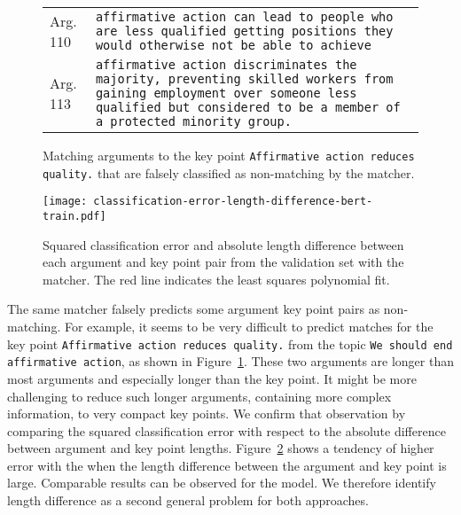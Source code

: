 \begin{figure}
    \begin{tabularx}{\linewidth}{@{}p{2em}X@{}}
        Arg. 110 & \texttt{affirmative action can lead to people who are less qualified getting positions they would otherwise not be able to achieve} \\
        Arg. 113 & \texttt{affirmative action discriminates the majority, preventing skilled workers from gaining employment over someone less qualified but considered to be a member of a protected minority group.}
    \end{tabularx}
    \caption{Matching arguments to the key point \texttt{Affirmative action reduces quality.} that are falsely classified as non-matching by the \BertBase matcher.}
    \label{example-5-110-113}
\end{figure}
\begin{figure}
    \texttt{[image: classification-error-length-difference-bert-train.pdf]}
    \caption{Squared classification error and absolute length difference between each argument and key point pair from the validation set with the \BertBase matcher. The red line indicates the least squares polynomial fit.}
    \label{classification-error-length}
\end{figure}
The same \BertBase matcher falsely predicts some argument key point pairs as non-matching.
For example, it seems to be very difficult to predict matches for the key point \texttt{Affirmative action reduces quality.} from the topic \texttt{We should end affirmative action}, as shown in Figure~\ref{example-5-110-113}. These two arguments are longer than most arguments %
and especially longer than the key point.
It might be more challenging to reduce such longer arguments, containing more complex information, to very compact key points.
We confirm that observation by comparing the squared classification error with respect to the absolute difference between argument and key point lengths.
Figure~\ref{classification-error-length} shows a tendency of higher error with the \BertBase when the length difference between the argument and key point is large.
Comparable results can be observed for the \Roberta model.
We therefore identify length difference as a second general problem for both approaches.
